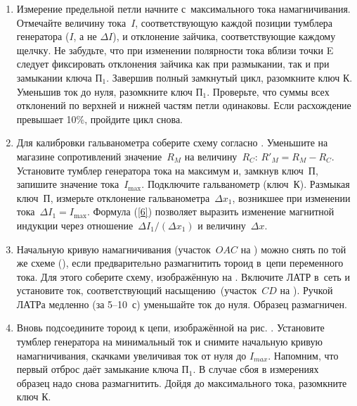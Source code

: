 \begin{lab:task}
\begin{enumerate}
	Если зайчик вышел за пределы шкалы~--- разомкните ключ~К$_2$ и, увеличив сопротивление~$R_M$, начните обход петли
	сначала.
	
	Если зашкаливания не произошло и максимальное отклонение зайчика близко к концу шкалы~--- приступайте к измерениям.
	
	
	\item Измерение предельной петли начните с~максимального тока намагничивания. Отмечайте величину тока~$I$, соответствующую
	каждой позиции тумблера генератора ($I$, а не $\Delta I$), и отклонение зайчика, соответствующие каждому щелчку.  
	Не забудьте, что при изменении полярности тока вблизи точки E следует фиксировать отклонения зайчика как при размыкании, так и при замыкании ключа $П_1$.
	Завершив полный  замкнутый цикл,  разомкните ключ $К$. Уменьшив ток до нуля, разомкните ключ $П_1$. 
	Проверьте, что суммы всех отклонений по верхней и нижней частям петли одинаковы. Если расхождение превышает 10\%, пройдите цикл снова.
	
	
	\item Для калибровки гальванометра соберите схему согласно . Уменьшите на магазине сопротивлений значение~$R_M$ на
	величину~$R_C$: $R'_M=R_M-R_C$. Установите тумблер генератора тока на максимум и, замкнув ключ~$П$, запишите значение
	тока~$I_{\max}$. Подключите гальванометр (ключ~$К$). Размыкая ключ~$П$, измерьте отклонение гальванометра~$\Delta x_1$,
	возникшее при изменении тока~$\Delta I_1=I_{\max}$. Формула (\eqref{6}) позволяет выразить изменение магнитной индукции через
	отношение~$\Delta I_1/(\Delta x_1)$ и величину~$\Delta x$.
	
	
	\item Начальную кривую намагничивания (участок~$OAC$ на ) можно снять по той же схеме (), если предварительно
	размагнитить тороид в~цепи переменного тока. Для этого соберите схему, изображённую на . Включите ЛАТР в~сеть и
	установите ток, соответствующий насыщению~(участок~$CD$ на ). Ручкой ЛАТРа медленно (за 5--10~с) уменьшайте ток до
	нуля. Образец размагничен.
	
	\item Вновь подсоедините тороид к цепи, изображённой на рис. . Установите тумблер генератора на минимальный ток и снимите  начальную кривую намагничивания,  скачками увеличивая ток от нуля до $I_{max}$. Напомним, что первый отброс даёт замыкание ключа $П_1$.  В случае сбоя в измерениях образец надо снова размагнитить. 
	Дойдя до максимального тока,  разомкните ключ $К$.


\end{enumerate}
\end{lab:task}
